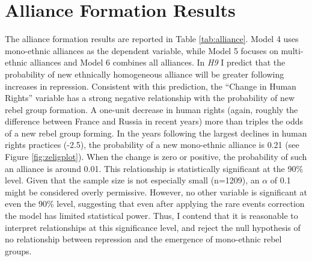 \documentclass[12pt,]{book}
\theoremstyle{definition}
\theoremstyle{definition}
\theoremstyle{definition}
\theoremstyle{remark}
\begin{document}
\hypertarget{alliance-formation-results}{%
\section{Alliance Formation Results}\label{alliance-formation-results}}

The alliance formation results are reported in Table \ref{tab:alliance}.
Model 4 uses mono-ethnic alliances as the dependent variable, while
Model 5 focuses on multi-ethnic alliances and Model 6 combines all
alliances. In \emph{H9} I predict that the probability of new ethnically
homogeneous alliance will be greater following increases in repression.
Consistent with this prediction, the ``Change in Human Rights'' variable
has a strong negative relationship with the probability of new rebel
group formation. A one-unit decrease in human rights (again, roughly the
difference between France and Russia in recent years) more than triples
the odds of a new rebel group forming. In the years following the
largest declines in human rights practices (-2.5), the probability of a
new mono-ethnic alliance is 0.21 (see Figure \ref{fig:zeligplot}). When
the change is zero or positive, the probability of such an alliance is
around 0.01. This relationship is statistically significant at the 90\%
level. Given that the sample size is not especially small (n=1209), an
\(\alpha\) of 0.1 might be considered overly permissive. However, no
other variable is significant at even the 90\% level, suggesting that
even after applying the rare events correction the model has limited
statistical power. Thus, I contend that it is reasonable to interpret
relationships at this significance level, and reject the null hypothesis
of no relationship between repression and the emergence of mono-ethnic
rebel groups.
\end{document}
